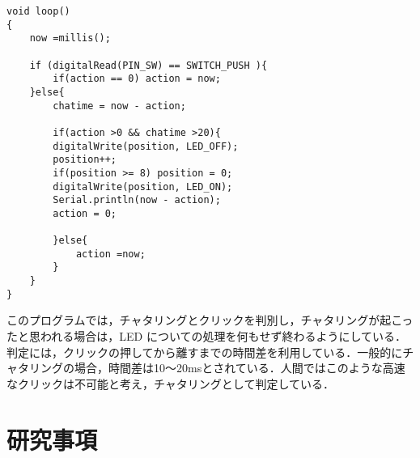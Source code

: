 \documentclass {ujarticle}
\begin{document}
\begin{enumerate}
\begin{lstlisting}
void loop()
{
	now =millis();

	if (digitalRead(PIN_SW) == SWITCH_PUSH ){
		if(action == 0) action = now;
	}else{
	    chatime = now - action;

	    if(action >0 && chatime >20){
		digitalWrite(position, LED_OFF);
		position++;
		if(position >= 8) position = 0;
		digitalWrite(position, LED_ON);
		Serial.println(now - action); 
		action = 0;

	    }else{
	        action =now;
	    }
	}
}
 \end{lstlisting}
 
  このプログラムでは，チャタリングとクリックを判別し，チャタリングが起こったと思われる場合は，LED についての処理を何もせず終わるようにしている．判定には，クリックの押してから離すまでの時間差を利用している．一般的にチャタリングの場合，時間差は10〜20msとされている．人間ではこのような高速なクリックは不可能と考え，チャタリングとして判定している．
 \end{enumerate}
 
 \section{研究事項}
 
\end{document}
